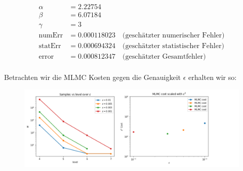 \begin{align*}
	\alpha  &=    2.22754   \\
	\beta   &=    6.07184   \\
	\gamma  &=    3   \\
\text{numErr}  &= 0.000118023   \quad \text{(geschätzter numerischer Fehler)}\\
\text{statErr} &= 0.000694324  \quad  \text{(geschätzter statistischer Fehler)}\\
\text{error}   &= 0.000812347  \quad  \text{(geschätzter Gesamtfehler)}\\
\end{align*}

Betrachten wir die MLMC Kosten gegen die Genauigkeit $ \epsilon $ erhalten wir so:
\begin{figure}[H]
	\centering
	\includegraphics[width=\textwidth]{plots/mlmctable.png} 
\end{figure}


